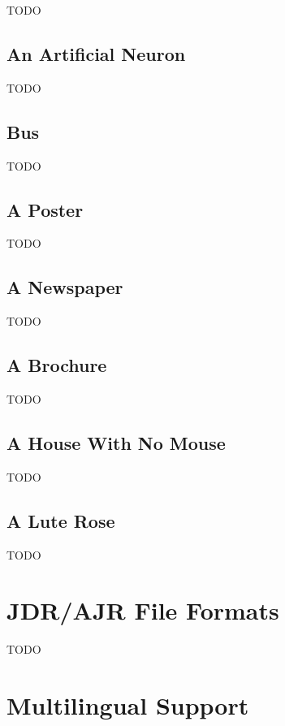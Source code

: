 TODO


\section{An Artificial Neuron}\label{sec:neuronexample}

TODO


\section{Bus}\label{sec:busexample}

TODO


\section{A Poster}\label{sec:postertutorial}

TODO


\section{A Newspaper}\label{sec:newstutorial}

TODO


\section{A Brochure}\label{sec:brochure}

TODO


\section{A House With No Mouse}\label{sec:accesstutorial}

TODO


\section{A Lute Rose}\label{sec:rosetutorial}

TODO


\chapter{JDR/AJR File Formats}\label{sec:jdrajrformat}

TODO


\chapter{Multilingual Support}\label{sec:multilingualsupport}

